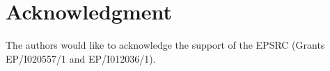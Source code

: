 \documentclass[journal]{IEEEtran}
\begin{document}
\section*{Acknowledgment}
The authors would like to acknowledge the support of the EPSRC (Grants EP/I020557/1 and EP/I012036/1).




%
%


%
\end{document}
